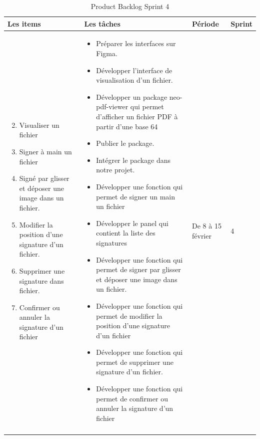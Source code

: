 \begin{longtable}{|p{4cm}|p{7cm}|p{2cm}|p{2cm}|}
  \hline
  \textbf{Les items} &\textbf{Les tâches} & \textbf{Période} & \textbf{Sprint} \\
  \hline
  \vspace{-\baselineskip}
  \begin{enumerate}
    \setcounter{enumi}{1}
    \itemsep0em 
      \item Visualiser un fichier
      \item Signer à main un fichier
      \item Signé par glisser et déposer une image dans un fichier.
      \item Modifier la position d'une signature d'un fichier.
      \item Supprimer une signature dans fichier.
      \item Confirmer ou annuler la signature d'un fichier
  \end{enumerate}
  &
  \vspace{-\baselineskip}
  \begin{itemize}
    \itemsep0em 
    \item Préparer les interfaces sur Figma.
    \item Développer l'interface de visualisation d'un fichier.
    \item Développer un package neo-pdf-viewer qui permet d'afficher un fichier PDF à partir d'une base 64
    \item Publier le package.
    \item Intégrer le package dans notre projet.
    \item Développer une fonction qui permet de signer un main un fichier
    \item Développer le panel qui contient la liste des signatures
    \item Développer une fonction qui permet de signer par glisser et déposer une image dans un fichier.
    \item Développer une fonction qui permet de modifier la position d'une signature d'un fichier
    \item Développer une fonction qui permet de supprimer une signature d'un fichier.
    \item Développer une fonction qui permet de confirmer ou annuler la signature d'un fichier


  \end{itemize}
  &
  De 8 à 15 février  
  &
  4
  \\
  \hline
  \caption{Product Backlog Sprint 4}
  \label{tab:product_backlog_sprint_4}



\end{longtable}


